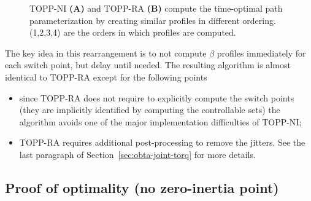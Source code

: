 \documentclass[journal]{IEEEtran}
\theoremstyle{plain}
\theoremstyle{definition}
\theoremstyle{definition}
\begin{document}
\begin{figure}[htb]
  \caption{\label{fig:CLC} TOPP-NI \textbf{(A)} and TOPP-RA
    \textbf{(B)} compute the time-optimal path parameterization by
    creating similar profiles in different ordering. (1,2,3,4) are the
    orders in which profiles are computed. }
\end{figure}

The key idea in this rearrangement is to not compute $\beta$ profiles
immediately for each switch point, but delay until needed. The
resulting algorithm is almost identical to TOPP-RA except for the
following points
\begin{itemize}
\item since TOPP-RA does not require to explicitly compute the switch
  points (they are implicitly identified by computing the controllable
  sets) the algorithm avoids one of the major implementation
  difficulties of TOPP-NI;
\item TOPP-RA requires additional post-processing to remove the
  jitters. See the last paragraph of Section~\ref{sec:obta-joint-torq}
  for more details.
\end{itemize}


\subsection{Proof of optimality (no zero-inertia point)}
\label{sec:proof-no}
\end{document}

